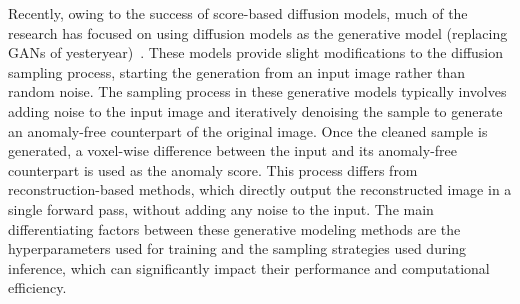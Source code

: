 Recently, owing to the success of score-based diffusion models, much of the research has focused on using diffusion models as the generative model (replacing GANs of yesteryear)~\citep{wyattAnoddpmAnomalyDetection2022,pinaya2022fast,liuUnsupervisedOutofDistributionDetection2023,behrendtPatchedDiffusionModels2023}. These models provide slight modifications to the diffusion sampling process, starting the generation from an input image rather than random noise. The sampling process in these generative models typically involves adding noise to the input image and iteratively denoising the sample to generate an anomaly-free counterpart of the original image. Once the cleaned sample is generated, a voxel-wise difference between the input and its anomaly-free counterpart is used as the anomaly score. This process differs from reconstruction-based methods, which directly output the reconstructed image in a single forward pass, without adding any noise to the input. The main differentiating factors between these generative modeling methods are the hyperparameters used for training and the sampling strategies used during inference, which can significantly impact their performance and computational efficiency.



